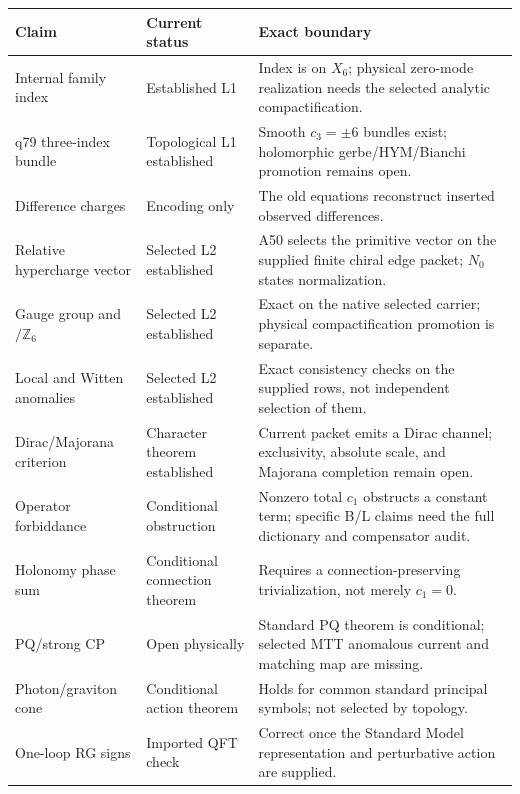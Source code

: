 \documentclass[11pt]{article}
\theoremstyle{plain}
\theoremstyle{definition}
\theoremstyle{remark}
\newcommand{\Z}{\mathbb{Z}}
\begin{document}
\begin{center}
\small
\begin{tabular}{>{\raggedright\arraybackslash}p{}
                >{\raggedright\arraybackslash}p{}
                >{\raggedright\arraybackslash}p{}}
\hline
Claim & Current status & Exact boundary \\
\hline
Internal family index & Established L1 & Index is on $X_6$; physical zero-mode realization needs the selected analytic compactification. \\
q79 three-index bundle & Topological L1 established & Smooth $c_3=\pm6$ bundles exist; holomorphic gerbe/HYM/Bianchi promotion remains open. \\
Difference charges & Encoding only & The old equations reconstruct inserted observed differences. \\
Relative hypercharge vector & Selected L2 established & A50 selects the primitive vector on the supplied finite chiral edge packet; $N_0$ states normalization. \\
Gauge group and $/\Z_6$ & Selected L2 established & Exact on the native selected carrier; physical compactification promotion is separate. \\
Local and Witten anomalies & Selected L2 established & Exact consistency checks on the supplied rows, not independent selection of them. \\
Dirac/Majorana criterion & Character theorem established & Current packet emits a Dirac channel; exclusivity, absolute scale, and Majorana completion remain open. \\
Operator forbiddance & Conditional obstruction & Nonzero total $c_1$ obstructs a constant term; specific B/L claims need the full dictionary and compensator audit. \\
Holonomy phase sum & Conditional connection theorem & Requires a connection-preserving trivialization, not merely $c_1=0$. \\
PQ/strong CP & Open physically & Standard PQ theorem is conditional; selected MTT anomalous current and matching map are missing. \\
Photon/graviton cone & Conditional action theorem & Holds for common standard principal symbols; not selected by topology. \\
One-loop RG signs & Imported QFT check & Correct once the Standard Model representation and perturbative action are supplied. \\
\hline
\end{tabular}
\end{center}
\end{document}
